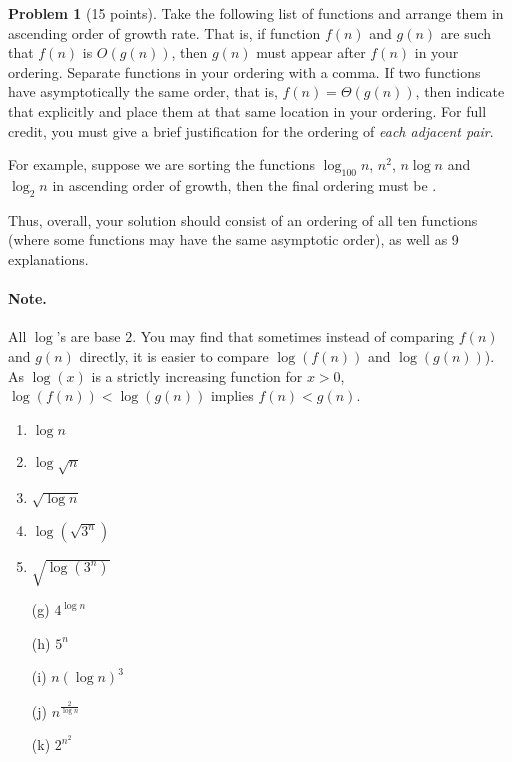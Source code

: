 \documentclass[12pt]{article}
\theoremstyle{definition}
\newtheorem{question}{Problem}
\begin{document}
\begin{question}[15 points]
Take the following list of functions and arrange them in ascending order of growth rate.  That is, if function $f(n)$ and $g(n)$ are such that $f(n)$ is $O(g(n))$, then $g(n)$ must appear after $f(n)$ in your ordering. 
Separate functions in your ordering with a comma. If two functions have asymptotically the same order, that is,
$f(n) = \Theta(g(n))$, then indicate that explicitly and place them at that same location in your ordering.  For full credit, you must give a brief justification for the ordering of {\em each adjacent pair}. 

For example, suppose we are sorting the functions $\log_{100} n$, $n^2$, $n \log n$ and $\log_2 n$ in ascending order of growth, then the final ordering must be .

Thus, overall, your solution should consist of an ordering of all ten functions (where some functions may have the same asymptotic order), as well as 9 explanations.

\vspace{-10pt}
\paragraph{Note.} %
All $\log$'s are base $2$. You may find that sometimes instead of comparing $f(n)$ and $g(n)$ directly, it is easier to compare $\log (f(n))$ and $\log (g(n))$). As $\log(x)$ is a strictly increasing function for $x>0$, $\log (f(n)) < \log(g(n))$ implies $f(n) < g(n)$. 

\begin{multicols}{2}
\begin{enumerate}[label = (\alph*)]
\item $\log n$
\item $\log{\sqrt{n}}$
\item $\sqrt{\log n}$ 
\item $\log{(\sqrt{3^n})}$
\item $\sqrt{\log{(3^n)}}$
\end{enumerate}
\columnbreak
\begin{itemize}
\item[(g)] $4^{{\log n}}$
\item[(h)] $5^n$
\item[(i)] $n(\log n)^{3}$
\item[(j)] $n^{\frac{2}{\log n }}$
\item[(k)] $2^{n^{2}}$
\end{itemize}
\end{multicols}
\end{question}
\end{document}
